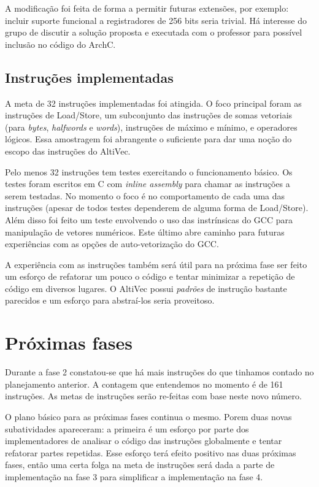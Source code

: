 \documentclass[twocolumn]{article}
\newcommand{\tech}[1]{\textit{#1}}
\begin{document}
A modificação foi feita de forma a permitir futuras extensões, por exemplo:
incluir suporte funcional a registradores de 256 bits seria trivial. Há interesse
do grupo de discutir a solução proposta e executada com o professor para possível
inclusão no código do ArchC.

\subsection{Instruções implementadas}

A meta de 32 instruções implementadas foi atingida. O foco principal foram as
instruções de Load/Store, um subconjunto das instruções de somas vetoriais
(para \tech{bytes}, \tech{halfwords} e \tech{words}), instruções de máximo e
mínimo, e operadores lógicos. Essa amostragem foi abrangente o suficiente para
dar uma noção do escopo das instruções do AltiVec.

Pelo menos 32 instruções tem testes exercitando o funcionamento básico. Os
testes foram escritos em C com \tech{inline assembly} para chamar as instruções
a serem testadas. No momento o foco é no comportamento de cada uma das
instruções (apesar de todos testes dependerem de alguma forma de Load/Store).
Além disso foi feito um teste envolvendo o uso das instrínsicas do GCC para
manipulação de vetores numéricos. Este último abre caminho para futuras
experiências com as opções de auto-vetorização do GCC.

A experiência com as instruções também será útil para na próxima fase ser feito
um esforço de refatorar um pouco o código e tentar minimizar a repetição de
código em diversos lugares. O AltiVec possui \tech{padrões} de instrução
bastante parecidos e um esforço para abstraí-los seria proveitoso.


\section{Próximas fases}

Durante a fase 2 constatou-se que há mais instruções do que tinhamos contado no
planejamento anterior. A contagem que entendemos no momento é de 161
instruções. As metas de instruções serão re-feitas com base neste novo número.

O plano básico para as próximas fases continua o mesmo. Porem duas novas
subatividades apareceram: a primeira é um esforço por parte dos implementadores
de analisar o código das instruções globalmente e tentar refatorar partes
repetidas. Esse esforço terá efeito positivo nas duas próximas fases, então uma
certa folga na meta de instruções será dada a parte de implementação na fase 3
para simplificar a implementação na fase 4.
\end{document}
